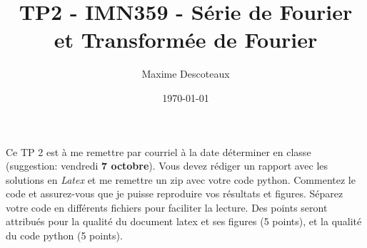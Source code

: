 \documentclass{article}
\title{TP2 - IMN359 - Série de Fourier et Transformée de Fourier}
\author{Maxime Descoteaux}
\date{\today}
\begin{document}
\maketitle

Ce TP 2 est à me remettre par courriel à la date déterminer en classe
(suggestion: vendredi {\bf 7 octobre}).
Vous devez rédiger un rapport avec les solutions en 
\emph{Latex} et me remettre un zip avec votre code python. Commentez
le code et assurez-vous que je puisse reproduire vos 
résultats et figures. 
Séparez votre code en différents fichiers pour faciliter la
lecture. Des points seront attribués pour la qualité du document latex
et ses figures (5 points), et la qualité du code python (5 points). 

\section*{}
\end{document}
